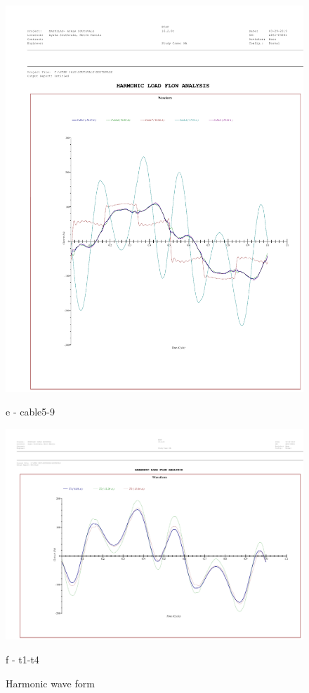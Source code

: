 \begin{figure}
\begin{minipage}[b]{0.4\linewidth}
	\includegraphics[width=\textwidth]{figures/fig_ch04_elecaudit_cable_harmonic_waveform59}
	\caption*{e - cable5-9}
\end{minipage}
	\hspace{0.05cm}
\begin{minipage}[b]{0.45\linewidth}
	\centering
	\includegraphics[width=\textwidth]{figures/fig_ch04_elecaudit_harmonic_waveformt1t4}
	\caption*{f - t1-t4}
\end{minipage}

	\caption{Harmonic wave form}
	\label{fig_ch04_elecaudit_harmonic_waveform}
\end{figure}



